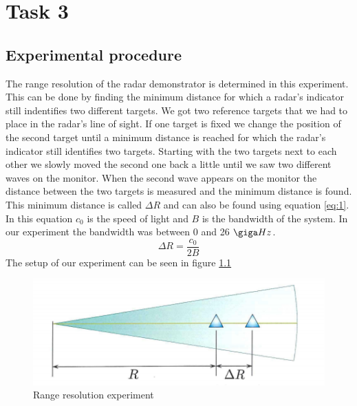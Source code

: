 \documentclass[final]{scrreprt} %
\begin{document}
\chapter{Task 3}

\section{Experimental procedure}
\label{sec:experimentalprocedure}
The range resolution of the radar demonstrator is determined in this experiment.
This can be done by finding the minimum distance for which a radar's indicator still indentifies two different targets. 
We got two reference targets that we had to place in the radar's line of sight.
If one target is fixed we change the position of the second target until a minimum distance is reached for which the radar's indicator still identifies two targets.
Starting with the two targets next to each other we slowly moved the second one back a little until we saw two different waves on the monitor.
When the second wave appears on the monitor the distance between the two targets is measured and the minimum distance is found.
This minimum distance is called $\Delta R$ and can also be found using equation \ref{eq:1}. 
In this equation $c_{0}$ is the speed of light and $B$ is the bandwidth of the system.
In our experiment the bandwidth was between 0 and 26 $\giga Hz$. 
\begin{equation} 
\label{eq:1}
\Delta R= \frac{c_{0}}{2B} 
\end{equation}
The setup of our experiment can be seen in figure \ref{fig:range}
\begin{figure}[h]
	\begin{center}
		\includegraphics[width=\linewidth/2]{resources/meet3.png}
	\end{center}
	\caption{Range resolution experiment}
	\label{fig:range}
\end{figure}
\end{document}
